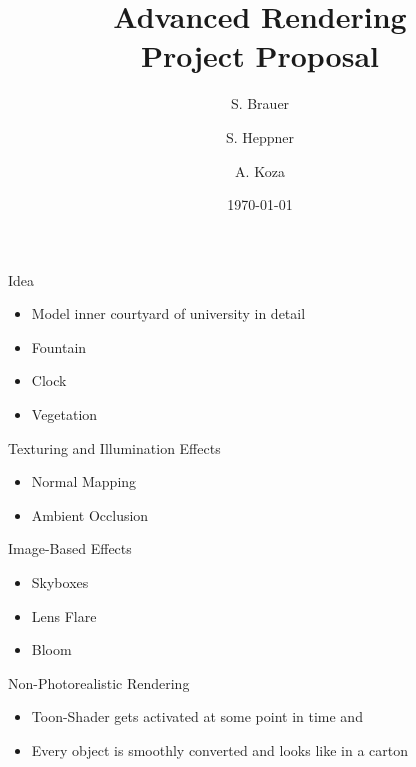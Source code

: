 \documentclass{beamer}
\title[Project Proposal]{Advanced Rendering \\ Project Proposal}
\author[Brauer, Heppner, Koza]
{S. Brauer \and S. Heppner \and A. Koza}
\institute[University of Paderborn]{Institute for Computer Science}
\date{\today}
\begin{document}
\begin{frame}
  \titlepage
\end{frame}

\begin{frame}{Idea}
	\begin{itemize}
		\item Model inner courtyard of university in detail
		\item Fountain
		\item Clock
		\item Vegetation
	\end{itemize}
\end{frame}

\begin{frame}{Texturing and Illumination Effects}
	\begin{itemize}
		\item Normal Mapping
		\item Ambient Occlusion
	\end{itemize}
\end{frame}

\begin{frame}{Image-Based Effects}
	\begin{itemize}
		\item Skyboxes
		\item Lens Flare
		\item Bloom
	\end{itemize}
\end{frame}

\begin{frame}{Non-Photorealistic Rendering}
	\begin{itemize}
		\item Toon-Shader gets activated at some point in time and
		\item Every object is smoothly converted and looks like in a carton
	\end{itemize}
\end{frame}
\end{document}
